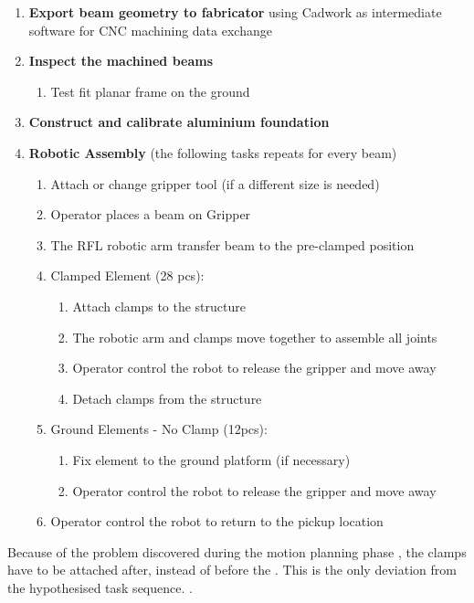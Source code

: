 \begin{enumerate}[nosep]
    \item \textbf{Export beam geometry to fabricator} using Cadwork as intermediate software for CNC machining data exchange
    \item \textbf{Inspect the machined beams}
    \begin{enumerate}
        \item Test fit planar frame on the ground
    \end{enumerate}
    \item \textbf{Construct and calibrate aluminium foundation }
    \item \textbf{Robotic Assembly} (the following tasks repeats for every beam)
    \begin{enumerate}
        \item Attach or change gripper tool (if a different size is needed)
        \item Operator places a beam on Gripper
        \item The RFL robotic arm transfer beam to the pre-clamped position 
        \item Clamped Element (28 pcs):
        \begin{enumerate}
            \item Attach clamps to the structure 
            \item The robotic arm and clamps move together to assemble all joints 
            \item Operator control the robot to release the gripper and move away
            \item Detach clamps from the structure
        \end{enumerate}
        \item Ground Elements - No Clamp (12pcs):
        \begin{enumerate}
            \item Fix element to the ground platform (if necessary)
            \item Operator control the robot to release the gripper and move away
        \end{enumerate}
        \item Operator control the robot to return to the pickup location 
    \end{enumerate}
\end{enumerate}

Because of the problem discovered during the motion planning phase , the clamps have to be attached after, instead of before the . This is the only deviation from the hypothesised task sequence. . 

